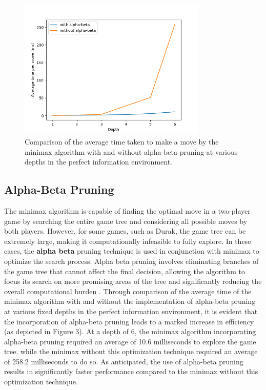 \begin{figure}[h]
  \centering
  \captionsetup{justification=centering}
  \includegraphics[width=0.8\textwidth]{../img/alpha-beta_comparison.png}
  \caption{Comparison of the average time taken to make a move by the minimax algorithm with and without alpha-beta pruning at various depths in the perfect information environment.}
  \label{WithWithoutAlphaBeta}
\end{figure}

\subsection{Alpha-Beta Pruning}

The minimax algorithm is capable of finding the optimal move in a two-player game by searching the entire game tree and considering all possible moves by both players. However, for some games, such as Durak, the game tree can be extremely large, making it computationally infeasible to fully explore. In these cases, the \textbf{alpha beta} pruning technique is used in conjunction with minimax to optimize the search process. Alpha beta pruning involves eliminating branches of the game tree that cannot affect the final decision, allowing the algorithm to focus its search on more promising areas of the tree and significantly reducing the overall computational burden \citep{AI4Ed}. Through comparison of the average time of the minimax algorithm with and without the implementation of alpha-beta pruning at various fixed depths in the perfect information environment, it is evident that the incorporation of alpha-beta pruning leads to a marked increase in efficiency (as depicted in Figure 3). At a depth of 6, the minimax algorithm incorporating alpha-beta pruning required an average of 10.6 milliseconds to explore the game tree, while the minimax without this optimization technique required an average of 258.2 milliseconds to do so. As anticipated, the use of alpha-beta pruning results in significantly faster performance compared to the minimax without this optimization technique.


